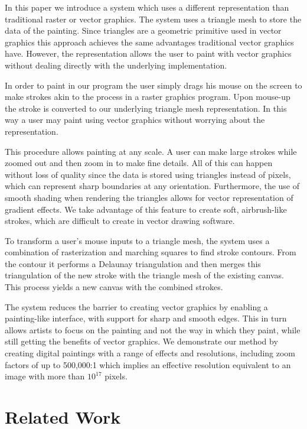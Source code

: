 \documentclass[review]{acmsiggraph}
\begin{document}
In this paper we introduce a system which  
uses a different representation than traditional raster or vector graphics.
The system uses a triangle mesh to store the data of the painting.
Since triangles are a geometric primitive used in vector graphics this approach achieves the
same advantages traditional vector graphics have. However, the representation allows the
user to paint with vector graphics without dealing directly with the underlying implementation.

In order to paint in our program the user simply drags his mouse on the screen to make
strokes akin to the process in a raster graphics program. Upon mouse-up the stroke is
converted to our underlying triangle mesh representation. In this way a user may paint using
vector graphics without worrying about the representation.

This procedure allows painting at any scale. A user can make large strokes
while zoomed out and then zoom in to make fine details. All of this can happen without
loss of quality since the data is stored using triangles instead of pixels, which can represent sharp boundaries at any orientation.  Furthermore, the use of smooth shading when rendering the triangles allows for vector representation of gradient effects.  We take advantage of this feature to create soft, airbrush-like strokes, which are difficult to create in vector drawing software.

To transform a user's mouse inputs to a triangle mesh,
the system uses a combination of rasterization and marching squares to
find stroke contours. From the contour it performs a Delaunay triangulation
and then merges this triangulation
of the new stroke with the triangle mesh of the existing canvas. This process yields
a new canvas with the combined strokes.

The system reduces the barrier to creating vector graphics by enabling a painting-like interface, with support for sharp and smooth edges. This in turn allows 
artists to focus on the painting and not the way in which they paint, while still 
getting the benefits of vector graphics. We demonstrate our method by creating digital paintings with a 
range of effects and resolutions, including zoom factors of up to 500,000:1 which implies an effective 
resolution equivalent to an image with more than $10^{17}$ pixels.

\section{Related Work}
\end{document}
